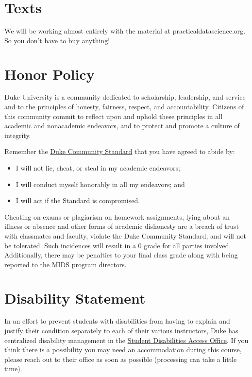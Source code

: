\documentclass[12pt]{article}
\begin{document}
\section{Texts}

We will be working almost entirely with the material at practicaldatascience.org. So you don't have to buy anything!

\section{Honor Policy}

Duke University is a community dedicated to scholarship, leadership, and service and to the principles of honesty, fairness, respect, and accountability. Citizens of this community commit to reflect upon and uphold these principles in all academic and nonacademic endeavors, and to protect and promote a culture of integrity.

Remember the \href{https://studentaffairs.duke.edu/conduct/about-us/duke-community-standard}{Duke Community Standard} that you have agreed to abide by:

\begin{itemize}
	\item I will not lie, cheat, or steal in my academic endeavors;
	\item I will conduct myself honorably in all my endeavors; and
	\item I will act if the Standard is compromised.
\end{itemize}

Cheating on exams or plagiarism on homework assignments, lying about an illness or absence and other forms of academic dishonesty are a breach of trust with classmates and faculty, violate the Duke Community Standard, and will not be tolerated. Such incidences will result in a 0 grade for all parties involved. Additionally, there may be penalties to your final class grade along with being reported to the MIDS program directors.

\section{Disability Statement}

In an effort to prevent students with disabilities from having to explain and justify their condition separately to each of their various instructors, Duke has centralized disability management in the \href{https://access.duke.edu/students}{Student Disabilities Access Office}. If you think there is a possibility you may need an accommodation during this course, please reach out to their office as soon as possible (processing can take a little time).
\end{document}
